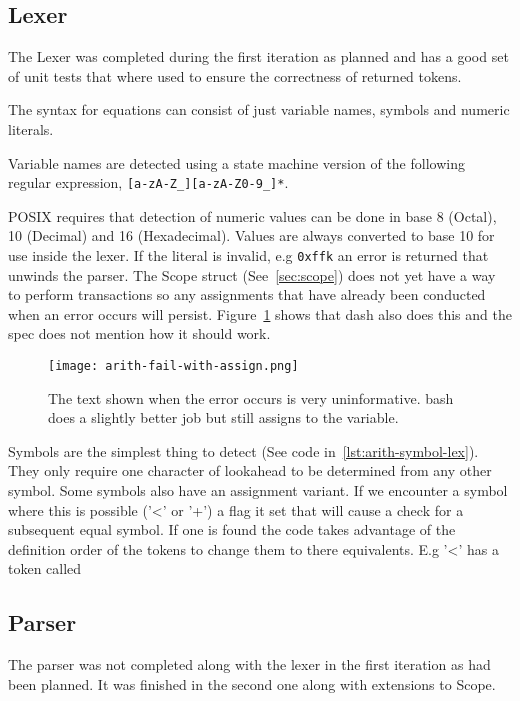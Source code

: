 \newpage %
\subsection{Lexer}
The Lexer was completed during the first iteration as planned and has a good set of unit tests that where used to ensure the correctness of returned tokens.

The syntax for equations can consist of just variable names, symbols and numeric literals.

Variable names are detected using a state machine version of the following regular expression, \verb![a-zA-Z_][a-zA-Z0-9_]*!.

POSIX requires that detection of numeric values can be done in base 8 (Octal), 10 (Decimal) and 16 (Hexadecimal).
Values are always converted to base 10 for use inside the lexer.
If the literal is invalid, e.g \verb!0xffk! an error is returned that unwinds the parser.
The Scope struct (See~\ref{sec:scope}) does not yet have a way to perform transactions so any assignments that have already been conducted when an error occurs will persist.
Figure~\ref{fig:arith-assign-fail} shows that dash also does this and the spec does not mention how it should work.

\begin{figure}[hp]
    \centering
    \texttt{[image: arith-fail-with-assign.png]}
    \caption[Dash assignment even with an error]{The text shown when the error occurs is very uninformative. bash does a slightly better job but still assigns to the variable.}
    \label{fig:arith-assign-fail}
\end{figure}

Symbols are the simplest thing to detect (See code in~\ref{lst:arith-symbol-lex}).
They only require one character of lookahead to be determined from any other symbol.
Some symbols also have an assignment variant.
If we encounter a symbol where this is possible ('<' or '+') a flag it set that will cause a check for a subsequent equal symbol.
If one is found the code takes advantage of the definition order of the tokens to change them to there equivalents.
E.g '<' has a token called 

\subsection{Parser}
The parser was not completed along with the lexer in the first iteration as had been planned.
It was finished in the second one along with extensions to Scope.

